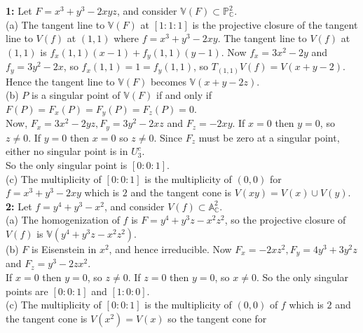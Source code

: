 \documentclass[a4paper]{article}
\begin{document}
    \textbf{1:} Let $F = x^3 + y^3 - 2xyz$, and consider $\mathbb{V}(F)
    \subset \mathbb{P}_{\mathbb{C}}^2$.\\
    (a) The tangent line to $\mathbb{V}(F)$ at $\left[ 1 : 1 : 1 \right] $ is
    the projective closure of the tangent line to $V(f)$ at $(1,1)$ where
    $f = x^3 + y^3 - 2xy$. The tangent line to $V(f)$ at $(1,1)$ is
    $f_x(1,1) (x-1) + f_y(1,1) (y-1)$. Now
    $f_x = 3x^2 - 2y$ and $f_y = 3y^2 - 2x$, so $f_x(1,1) = 1 = f_y (1,1)$, so
    $T_{(1,1)}V(f) = V\left( x+y-2 \right) $. Hence
    the tangent line to $\mathbb{V}(F)$ becomes
    $\mathbb{V}(x+y-2z)$.\\
    \linebreak
    (b) $P$ is a singular point of $\mathbb{V}(F)$ if and only if
    $F(P) = F_x(P) = F_y(P) = F_z(P) = 0$.\\
    Now,  $F_x = 3x^2 - 2yz, F_y = 3y^2 - 2xz$ and
    $F_z = -2xy$. If $x = 0$ then $y = 0$, so $z\neq 0$. If
    $y = 0$ then $x=0$ so $z\neq 0$. Since $F_z$ must be zero at a singular
    point, either no singular point is in $U_3^{c}$.\\
    So the only singular point is
    $\left[ 0 : 0 : 1 \right]$. \\
    \linebreak
    (c) The multiplicity of $\left[ 0:0:1 \right] $ is
    the multiplicity of $(0,0)$ for $f = x^3 + y^3 - 2xy$ which is
    $2$ and the tangent cone is $V(xy) = V(x) \cup V(y)$.\\
    \linebreak
    \textbf{2:} Let $f = y^{4} + y^3 - x^2$, and consider $V(f) \subset 
    \mathbb{A}_{\mathbb{C}}^2$.\\
    (a) The homogenization of $f$ is
    $F = y^{4} + y^{3}z - x^2 z^2$, so the projective closure of
    $V(f)$ is $\mathbb{V}(y^{4}+y^3 z - x^2 z^2)$.\\
    \linebreak
    (b) $F$ is Eisenstein in $x^2$, and hence irreducible. Now
    $F_x = -2x z^2, F_y = 4y^3 + 3y^2 z$ and
    $F_z = y^3 - 2zx^2$.\\
    If $x = 0$ then $y = 0$, so $z\neq 0$. If
    $z = 0$ then $y = 0$, so $x \neq 0$. So the only singular points are
    $\left[ 0 : 0 : 1 \right] $ and $\left[ 1 : 0 : 0 \right] $.\\
    \linebreak
    (c) The multiplicity of $\left[ 0 : 0 : 1 \right] $ is the multiplicity of
    $(0,0)$ of $f$ which is $2$ and the
    tangent cone is $V(x^2) = V(x)$ so the tangent cone for
\end{document}
